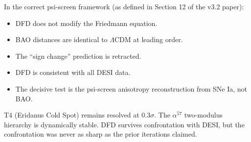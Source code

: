 \documentclass[11pt,a4paper]{article}
\newcommand{\LCDM}{$\Lambda$CDM}
\begin{document}
In the correct psi-screen framework (as defined in Section 12 of
the v3.2 paper):
\begin{itemize}[nosep]
\item DFD does not modify the Friedmann equation.
\item BAO distances are identical to \LCDM{} at leading order.
\item The ``sign change'' prediction is retracted.
\item DFD is consistent with all DESI data.
\item The decisive test is the psi-screen anisotropy reconstruction
  from SNe Ia, not BAO.
\end{itemize}

T4 (Eridanus Cold Spot) remains resolved at $0.3\sigma$.
The $\alpha^{57}$ two-modulus hierarchy is dynamically stable.
DFD survives confrontation with DESI, but the confrontation was
never as sharp as the prior iterations claimed.
\end{document}
